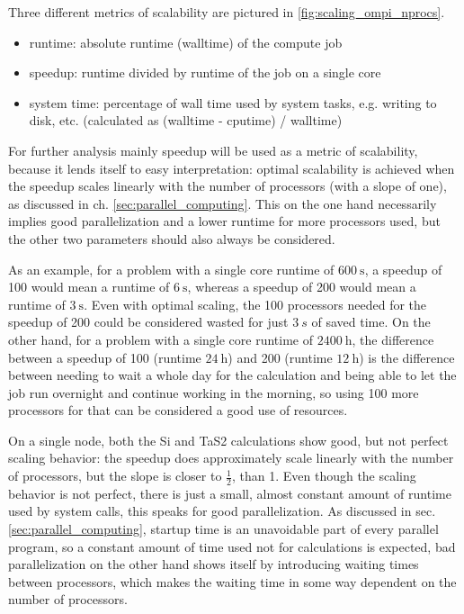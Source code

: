 \documentclass[main.tex]{subfiles}
\begin{document}

Three different metrics of scalability are pictured in \ref{fig:scaling_ompi_nprocs}.
\begin{itemize}
    \item runtime: absolute runtime (walltime) of the compute job
    \item speedup: runtime divided by runtime of the job on a single core
    \item system time: percentage of wall time used by system tasks, e.g. writing to disk, etc. (calculated as (walltime - cputime) / walltime)
\end{itemize}
For further analysis mainly speedup will be used as a metric of scalability, because it lends itself to easy interpretation: optimal scalability is achieved when the speedup scales linearly with the number of processors (with a slope of one), as discussed in ch. \ref{sec:parallel_computing}.
This on the one hand necessarily implies good parallelization and a lower runtime for more processors used, but the other two parameters should also always be considered.

As an example, for a problem with a single core runtime of \(\SI{600}{\s}\), a speedup of 100 would mean a runtime of \(\SI{6}{\s}\), whereas a speedup of 200 would mean a runtime of \(\SI{3}{\s}\).
Even with optimal scaling, the 100 processors needed for the speedup of 200 could be considered wasted for just \(\SI{3}{s}\) of saved time.
On the other hand, for a problem with a single core runtime of \(\SI{2400}{\hour}\), the difference between a speedup of 100 (runtime \(\SI{24}{\hour}\)) and 200 (runtime \(\SI{12}{\hour}\)) is the difference between needing to wait a whole day for the calculation and being able to let the job run overnight and continue working in the morning, so using 100 more processors for that can be considered a good use of resources. 

On a single node, both the Si and TaS2 calculations show good, but not perfect scaling behavior: the speedup does approximately scale linearly with the number of processors, but the slope is closer to \(\frac{1}{2}\), than 1.
Even though the scaling behavior is not perfect, there is just a small, almost constant amount of runtime used by system calls, this speaks for good parallelization.
As discussed in sec. \ref{sec:parallel_computing}, startup time is an unavoidable part of every parallel program, so a constant amount of time used not for calculations is expected, bad parallelization on the other hand shows itself by introducing waiting times between processors, which makes the waiting time in some way dependent on the number of processors.
\end{document}
